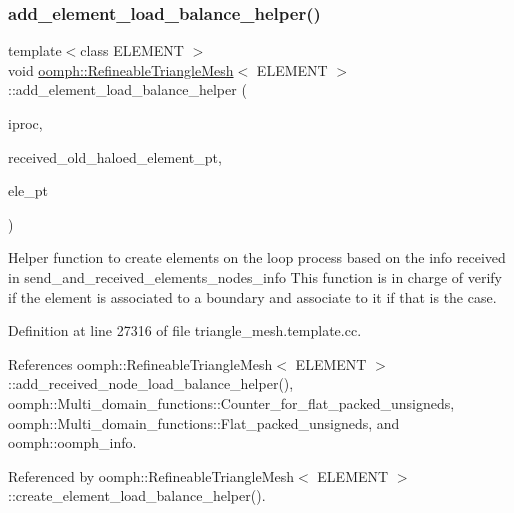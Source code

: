 \subsubsection{\texorpdfstring{add\+\_\+element\+\_\+load\+\_\+balance\+\_\+helper()}{add\_element\_load\_balance\_helper()}}
{\footnotesize\ttfamily template$<$class E\+L\+E\+M\+E\+NT $>$ \\
void \hyperlink{classoomph_1_1RefineableTriangleMesh}{oomph\+::\+Refineable\+Triangle\+Mesh}$<$ E\+L\+E\+M\+E\+NT $>$\+::add\+\_\+element\+\_\+load\+\_\+balance\+\_\+helper (\begin{DoxyParamCaption}\item[{const unsigned \&}]{iproc,  }\item[{\hyperlink{classoomph_1_1Vector}{Vector}$<$ \hyperlink{classoomph_1_1Vector}{Vector}$<$ std\+::map$<$ unsigned, \hyperlink{classoomph_1_1FiniteElement}{Finite\+Element} $\ast$$>$ $>$ $>$ \&}]{received\+\_\+old\+\_\+haloed\+\_\+element\+\_\+pt,  }\item[{\hyperlink{classoomph_1_1FiniteElement}{Finite\+Element} $\ast$}]{ele\+\_\+pt }\end{DoxyParamCaption})\hspace{0.3cm}{\ttfamily [protected]}}



Helper function to create elements on the loop process based on the info received in send\+\_\+and\+\_\+received\+\_\+elements\+\_\+nodes\+\_\+info This function is in charge of verify if the element is associated to a boundary and associate to it if that is the case. 



Definition at line 27316 of file triangle\+\_\+mesh.\+template.\+cc.



References oomph\+::\+Refineable\+Triangle\+Mesh$<$ E\+L\+E\+M\+E\+N\+T $>$\+::add\+\_\+received\+\_\+node\+\_\+load\+\_\+balance\+\_\+helper(), oomph\+::\+Multi\+\_\+domain\+\_\+functions\+::\+Counter\+\_\+for\+\_\+flat\+\_\+packed\+\_\+unsigneds, oomph\+::\+Multi\+\_\+domain\+\_\+functions\+::\+Flat\+\_\+packed\+\_\+unsigneds, and oomph\+::oomph\+\_\+info.



Referenced by oomph\+::\+Refineable\+Triangle\+Mesh$<$ E\+L\+E\+M\+E\+N\+T $>$\+::create\+\_\+element\+\_\+load\+\_\+balance\+\_\+helper().

\mbox{\label{classoomph_1_1RefineableTriangleMesh_ad08155d333cd4f57cc23818b6f328b6e}} 
